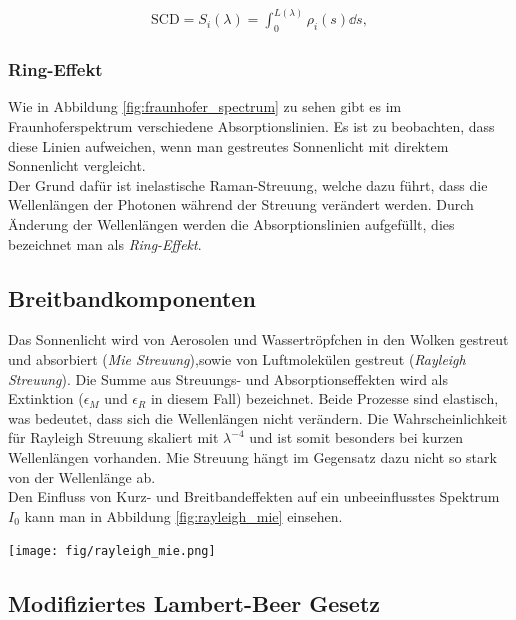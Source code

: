 \documentclass[12pt, a4paper, bibliography=totoc]{scrartcl}
\begin{document}
\begin{multicols}{2}
\begin{align}
    \text{SCD} = S_i (\lambda) = \int_0^{L(\lambda)} \rho_i (s) \dd s ,\label{eq:SCD}
\end{align}

\subsubsection{Ring-Effekt}

Wie in Abbildung \ref{fig:fraunhofer_spectrum} zu sehen gibt es im Fraunhoferspektrum verschiedene Absorptionslinien.
Es ist zu beobachten, dass diese Linien aufweichen, wenn man gestreutes Sonnenlicht mit direktem Sonnenlicht vergleicht.\\
Der Grund dafür ist inelastische Raman-Streuung, welche dazu führt, dass die Wellenlängen der Photonen während der Streuung verändert werden.
Durch Änderung der Wellenlängen werden die Absorptionslinien aufgefüllt,
dies bezeichnet man als \textit{Ring-Effekt}.

\subsection{Breitbandkomponenten}

Das Sonnenlicht wird von Aerosolen und Wassertröpfchen in den Wolken gestreut und absorbiert (\textit{Mie Streuung}),sowie von Luftmolekülen gestreut (\textit{Rayleigh Streuung}).
Die Summe aus Streuungs- und Absorptionseffekten wird als Extinktion ($\epsilon_M$ und $\epsilon_R$ in diesem Fall) bezeichnet.
Beide Prozesse sind elastisch, was bedeutet, dass sich die Wellenlängen nicht verändern.
Die Wahrscheinlichkeit für Rayleigh Streuung skaliert mit $\lambda^{-4}$ und ist somit besonders bei kurzen Wellenlängen vorhanden.
Mie Streuung hängt im Gegensatz dazu nicht so stark von der Wellenlänge ab.\\

Den Einfluss von Kurz- und Breitbandeffekten auf ein unbeeinflusstes Spektrum $I_0$ kann man in Abbildung \ref{fig:rayleigh_mie} einsehen.

\begin{center}
    \texttt{[image: fig/rayleigh\_mie.png]}
    \label{fig:rayleigh_mie}
\end{center}



\subsection{Modifiziertes Lambert-Beer Gesetz}\label{ssec:mod_lamb-beer_law}


\end{multicols}
\end{document}
